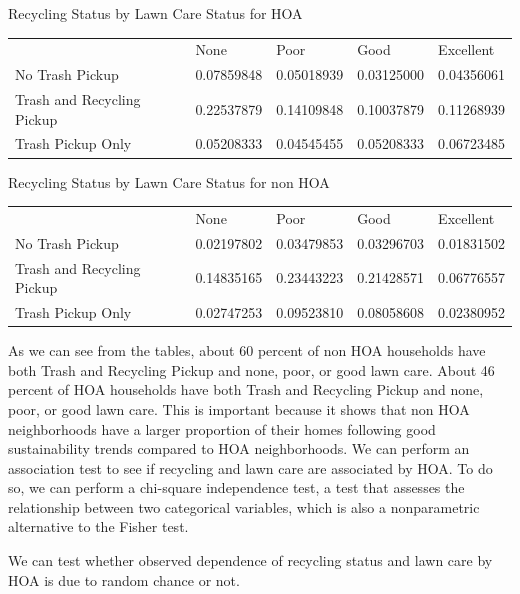 \documentclass{article}
\begin{document}
\begin{center} Recycling Status by Lawn Care Status for HOA \end{center}
\begin{table}[H]
\begin{tabular}{lllll}
                           & None       & Poor       & Good       & Excellent  \\
No Trash Pickup            & 0.07859848 & 0.05018939 & 0.03125000 & 0.04356061 \\
Trash and Recycling Pickup & 0.22537879 & 0.14109848 & 0.10037879 & 0.11268939 \\
Trash Pickup Only          & 0.05208333 & 0.04545455 & 0.05208333 & 0.06723485
\end{tabular}
\end{table}

\begin{center} Recycling Status by Lawn Care Status for non HOA \end{center}
\begin{table}[H]
\begin{tabular}{lllll}
                           & None       & Poor       & Good       & Excellent  \\
No Trash Pickup            & 0.02197802 & 0.03479853 & 0.03296703 & 0.01831502 \\
Trash and Recycling Pickup & 0.14835165 & 0.23443223 & 0.21428571 & 0.06776557 \\
Trash Pickup Only          & 0.02747253 & 0.09523810 & 0.08058608 & 0.02380952
\end{tabular}
\end{table}

As we can see from the tables, about 60 percent of non HOA households have both Trash and Recycling Pickup and none, poor, or good lawn care. About 46 percent of HOA households have both Trash and Recycling Pickup and none, poor, or good lawn care. This is important because it shows that non HOA neighborhoods have a larger proportion of their homes following good sustainability trends compared to HOA neighborhoods. 
\newline
We can perform an association test to see if recycling and lawn care are associated by HOA. To do so, we can perform a chi-square independence test, a test that assesses the relationship between two categorical variables, which is also a nonparametric alternative to the Fisher test.

We can test whether observed dependence of recycling status and lawn care by HOA is due to random chance or not. 
\end{document}
